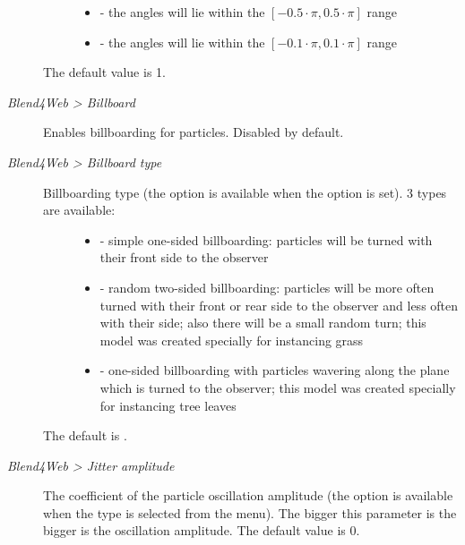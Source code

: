 \documentclass[a4paper,12pt,oneside]{sphinxmanual}
\begin{document}
\begin{description}
\begin{description}
\begin{itemize}
\item {} 
 - the angles will lie within the \([-0.5 \cdot \pi, 0.5 \cdot \pi]\) range

\item {} 
 - the angles will lie within the \([-0.1 \cdot \pi, 0.1 \cdot \pi]\) range

\end{itemize}

\end{description}

The default value is 1.

\item[{\emph{Blend4Web \textgreater{} Billboard}}] \leavevmode
Enables billboarding for particles. Disabled by default.

\item[{\emph{Blend4Web \textgreater{} Billboard type}}] \leavevmode\begin{description}
\item[{Billboarding type (the option is available when the  option is set). 3 types are available:}] \leavevmode\begin{itemize}
\item {} 
 - simple one-sided billboarding: particles will be turned with their front side to the observer

\item {} 
 - random two-sided billboarding: particles will be more often turned with their front or rear side to the observer and less often with their side; also there will be a small random turn; this model was created specially for instancing grass

\item {} 
 - one-sided billboarding with particles wavering along the plane which is turned to the observer; this model was created specially for instancing tree leaves

\end{itemize}

\end{description}

The default is .

\item[{\emph{Blend4Web \textgreater{} Jitter amplitude}}] \leavevmode
The coefficient of the particle oscillation amplitude (the option is available when the  type is selected from the  menu). The bigger this parameter is the bigger is the oscillation amplitude. The default value is 0.


\end{description}
\end{document}
